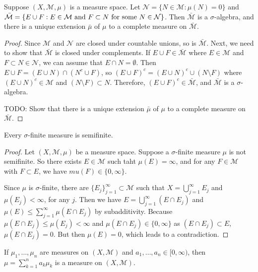 \begin{theorem}
Suppose $(X, \mathcal{M}, \mu)$ is a measure space.
Let $\mathcal{N} = \{ N \in \mathcal{M}: \mu(N) = 0 \}$ and $\Bar{\mathcal{M}} = \{ E \cup F: E \in \mathcal{M} \text{ and } F \subset N \text{ for some } N \in \mathcal{N} \}$.
Then $\bar{\mathcal{M}}$ is a $\sigma$-algebra, and there is a unique extension $\bar{\mu}$ of $\mu$ to a complete measure on $\bar{\mathcal{M}}$.
\end{theorem}

\begin{proof}
Since $\mathcal{M}$ and $\mathcal{N}$ are closed under countable unions, so is $\bar{\mathcal{M}}$.
Next, we need to show that $\bar{\mathcal{M}}$ is closed under complements.
If $E \cup F \in \bar{\mathcal{M}}$ where $E \in \mathcal{M}$ and $F \subset N \in \mathcal{N}$, we can assume that $E \cap N = \emptyset$.
Then $E \cup F = (E \cup N) \cap (N^c \cup F)$, so $(E \cup F)^c = (E \cup N)^c \cup (N \setminus F)$ where $(E \cup N)^c \in \mathcal{M}$ and $(N \setminus F) \subset N$.
Therefore, $(E \cup F)^c \in \bar{\mathcal{M}}$, and $\bar{\mathcal{M}}$ is a $\sigma$-algebra.

TODO: Show that there is a unique extension $\bar{\mu}$ of $\mu$ to a complete measure on $\bar{\mathcal{M}}$.
\end{proof}

\begin{proposition}
Every $\sigma$-finite measure is semifinite.
\end{proposition}

\begin{proof}
Let $(X, \mathcal{M}, \mu)$ be a measure space.
Suppose a $\sigma$-finite measure $\mu$ is not semifinite.
So there exists $E \in \mathcal{M}$ such taht $\mu(E) = \infty$, and for any $F \in \mathcal{M}$ with $F \subset E$, we have $mu(F) \in \{ 0, \infty \}$.

Since $\mu$ is $\sigma$-finite, there are $\{ E_j \}_{j=1}^{\infty} \subset \mathcal{M}$ such that $X = \bigcup_{j=1}^{\infty} E_j$ and $\mu(E_j) < \infty$, for any $j$.
Then we have $E = \bigcup_{j=1}^{\infty} (E \cap E_j)$ and $\mu(E) \le \sum_{j=1}^{\infty} \mu(E \cap E_j)$ by subadditivity.
Because $\mu(E \cap E_j) \le \mu(E_j) < \infty$ and $\mu(E \cap E_j) \in \{ 0, \infty \}$ as $(E \cap E_j) \subset E$, $\mu(E \cap E_j) = 0$.
But then $\mu(E) = 0$, which leads to a contradiction.
\end{proof}

\begin{proposition}
If $\mu_1, \dots, \mu_n$ are measures on $(X, \mathcal{M})$ and $a_1, \dots, a_n \in [0, \infty)$, then $\mu = \sum_{k=1}^{n} a_k \mu_k$ is a measure on $(X, \mathcal{M})$.
\end{proposition}

